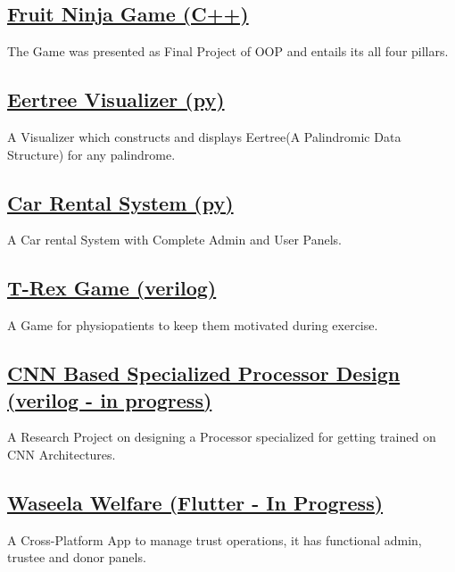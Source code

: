 \documentclass[]{m abbas resume' 2022}
\begin{document}
\begin{minipage}[t]{0.39\textwidth}
    \subsection{\href{https://github.com/smabbasht/CS224-OOP-FruitNinjaGame-cpp}{\textbf{Fruit Ninja Game (C++)}}}
    The Game was presented as Final Project of OOP and entails its all four pillars.

    \subsection{\href{https://github.com/smabbasht/CS201-DataSructures-II-Project-eertree}{\textbf{Eertree Visualizer (py)}}}
    A Visualizer which constructs and displays Eertree(A Palindromic Data Structure) for any palindrome.

    \subsection{\href{https://github.com/smabbasht/HU-DSA-Project}{\textbf{Car Rental System (py)}}}
    A Car rental System with Complete Admin and User Panels.

    \subsection{\href{https://github.com/smabbasht/CS370-DIgital-Logic-Design-Project}{\textbf{T-Rex Game (verilog)}}}
    A Game for physiopatients to keep them motivated during exercise.
    
    \subsection{\href{https://github.com/smabbasht/CS330-ResearchProject-ComputerArchitecture}{CNN Based Specialized Processor Design (verilog - in progress)}}
    A Research Project on designing a Processor specialized for getting trained on CNN Architectures.

    \subsection{\href{https://github.com/smabbasht/Waseela-Welfare}{\textbf{Waseela Welfare (Flutter -  In Progress)}}}
    A Cross-Platform App to manage trust operations, it has functional admin, trustee and donor panels.
 



\end{minipage}
\end{document}
